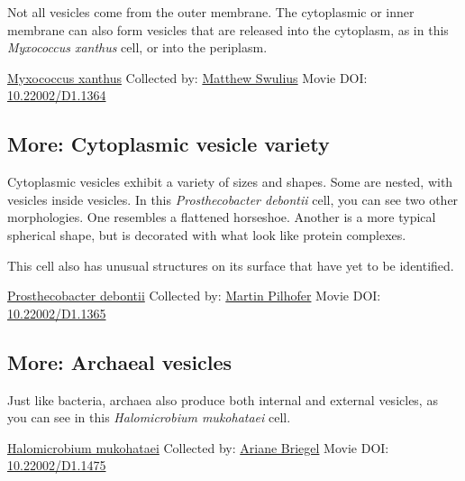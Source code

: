 \documentclass[]{tufte-book}
\begin{document}
Not all vesicles come from the outer membrane. The cytoplasmic or inner membrane can also form vesicles that are released into the cytoplasm, as in this \emph{Myxococcus xanthus} cell, or into the periplasm.



\hypertarget{htmlwidget-1d468c3d42e0ddee1eba}{}

\label{fig:2-4c}\protect\hyperlink{tree}{Myxococcus xanthus} Collected by: \protect\hyperlink{matthew_swulius}{Matthew Swulius} Movie DOI: \href{https://doi.org/10.22002/D1.1364}{10.22002/D1.1364}

\hypertarget{Cytoplasmic_vesicle_variety}{%
\subsection*{More: Cytoplasmic vesicle variety}\label{Cytoplasmic_vesicle_variety}}

Cytoplasmic vesicles exhibit a variety of sizes and shapes. Some are nested, with vesicles inside vesicles. In this \emph{Prosthecobacter debontii} cell, you can see two other morphologies. One resembles a flattened horseshoe. Another is a more typical spherical shape, but is decorated with what look like protein complexes.

This cell also has unusual structures on its surface that have yet to be identified.



\hypertarget{htmlwidget-1ea72e096e99acdfe19a}{}

\label{fig:2-4d}\protect\hyperlink{tree}{Prosthecobacter debontii} Collected by: \protect\hyperlink{martin_pilhofer}{Martin Pilhofer} Movie DOI: \href{https://doi.org/10.22002/D1.1365}{10.22002/D1.1365}

\hypertarget{Archaeal_vesicles}{%
\subsection*{More: Archaeal vesicles}\label{Archaeal_vesicles}}

Just like bacteria, archaea also produce both internal and external vesicles, as you can see in this \emph{Halomicrobium mukohataei} cell.



\hypertarget{htmlwidget-4faacda373fa1208c3ce}{}

\label{fig:2-4e}\protect\hyperlink{tree}{Halomicrobium mukohataei} Collected by: \protect\hyperlink{ariane_briegel}{Ariane Briegel} Movie DOI: \href{https://doi.org/10.22002/D1.1475}{10.22002/D1.1475}
\end{document}
